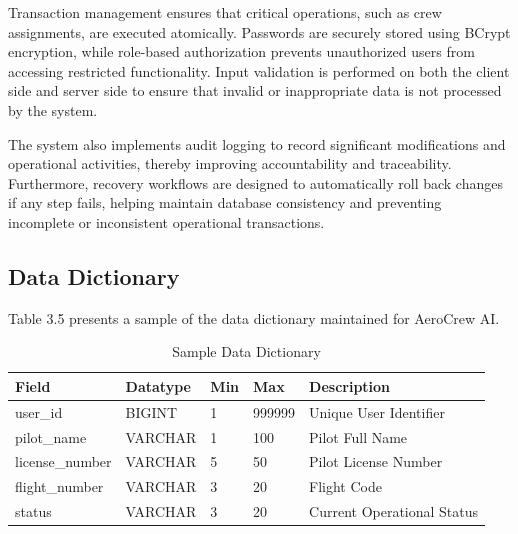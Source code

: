 \documentclass[12pt,a4paper]{report}
\begin{document}
Transaction management ensures that critical operations, such as crew assignments, are executed atomically. Passwords are securely stored using BCrypt encryption, while role-based authorization prevents unauthorized users from accessing restricted functionality. Input validation is performed on both the client side and server side to ensure that invalid or inappropriate data is not processed by the system.

The system also implements audit logging to record significant modifications and operational activities, thereby improving accountability and traceability. Furthermore, recovery workflows are designed to automatically roll back changes if any step fails, helping maintain database consistency and preventing incomplete or inconsistent operational transactions.

\subsection{Data Dictionary}

Table 3.5 presents a sample of the data dictionary maintained for AeroCrew AI.

\begin{table}[H]

\centering

\caption{Sample Data Dictionary}

\begin{tabular}{|p{3cm}|p{3cm}|p{1.5cm}|p{1.5cm}|p{5cm}|}

\hline

\textbf{Field} &
\textbf{Datatype} &
\textbf{Min} &
\textbf{Max} &
\textbf{Description}\\

\hline

user\_id &
BIGINT &
1 &
999999 &
Unique User Identifier\\

\hline

pilot\_name &
VARCHAR &
1 &
100 &
Pilot Full Name\\

\hline

license\_number &
VARCHAR &
5 &
50 &
Pilot License Number\\

\hline

flight\_number &
VARCHAR &
3 &
20 &
Flight Code\\

\hline

status &
VARCHAR &
3 &
20 &
Current Operational Status\\

\hline

\end{tabular}

\end{table}
\end{document}
